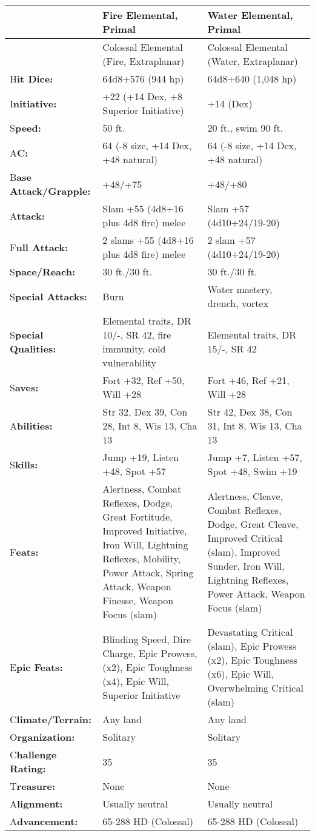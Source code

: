 \documentclass{article}
\begin{document}
\vspace{12pt}
\begin{tabular}{|>{\raggedright}p{65pt}|>{\raggedright}p{124pt}|>{\raggedright}p{124pt}|}
\hline
   & F\textbf{ire Elemental, Primal } & W\textbf{ater Elemental, Primal }\tabularnewline
\hline
 & Colossal Elemental (Fire, Extraplanar)  & Colossal Elemental (Water, Extraplanar) 
\tabularnewline
\hline
H\textbf{it Dice:}  & 64d8+576 (944 hp)  & 64d8+640 (1,048 hp) \tabularnewline
\hline
I\textbf{nitiative:}  & +22 (+14 Dex, +8 Superior Initiative)  & +14 (Dex) \tabularnewline
\hline
S\textbf{peed:}  & 50 ft.  & 20 ft., swim 90 ft. \tabularnewline
\hline
A\textbf{C:}  & 64 (-8 size, +14 Dex, +48 natural)  & 64 (-8 size, +14 Dex, +48 
natural) \tabularnewline
\hline
B\textbf{ase Attack/Grapple:} & +48/+75 & +48/+80\tabularnewline
\hline
A\textbf{ttack:} & Slam +55 (4d8+16 plus 4d8 fire) melee & Slam +57 (4d10+24/19-20)\tabularnewline
\hline
F\textbf{ull Attack:} & 2 slams +55 (4d8+16 plus 4d8 fire) melee & 2 slam +57 (4d10+24/19-20)\tabularnewline
\hline
S\textbf{pace/Reach:}  & 30 ft./30 ft.  & 30 ft./30 ft. \tabularnewline
\hline
S\textbf{pecial Attacks:}  & Burn  & Water mastery, drench, vortex \tabularnewline
\hline
S\textbf{pecial Qualities:}  & Elemental traits, DR 10/-, SR 42, fire immunity, 
cold vulnerability & Elemental traits, DR 15/-, SR 42 \tabularnewline
\hline
S\textbf{aves:} & Fort +32, Ref +50, Will +28  & Fort +46, Ref +21, Will +28 \tabularnewline
\hline
A\textbf{bilities:}  & Str 32, Dex 39, Con 28, Int 8, Wis 13, Cha 13  & Str 42, 
Dex 38, Con 31, Int 8, Wis 13, Cha 13 \tabularnewline
\hline
S\textbf{kills:}  & Jump +19, Listen +48, Spot +57 & Jump +7, Listen +57, Spot 
+48, Swim +19\tabularnewline
\hline
F\textbf{eats:} & Alertness, Combat Reflexes, Dodge, Great Fortitude, Improved 
Initiative, Iron Will, Lightning Reflexes, Mobility, Power Attack, Spring Attack, 
Weapon Finesse, Weapon Focus (slam) & Alertness, Cleave, Combat Reflexes, Dodge, 
Great Cleave, Improved Critical (slam), Improved Sunder, Iron Will, Lightning Reflexes, 
Power Attack, Weapon Focus (slam)\tabularnewline
\hline
E\textbf{pic Feats:}  & Blinding Speed, Dire Charge, Epic Prowess, (x2), Epic Toughness 
(x4), Epic Will, Superior Initiative  & Devastating Critical (slam), Epic Prowess 
(x2), Epic Toughness (x6), Epic Will, Overwhelming Critical (slam) \tabularnewline
\hline
C\textbf{limate/Terrain:}  & Any land  & Any land \tabularnewline
\hline
O\textbf{rganization:}  & Solitary  & Solitary \tabularnewline
\hline
C\textbf{hallenge Rating:}  & 35  & 35 \tabularnewline
\hline
T\textbf{reasure:}  & None  & None \tabularnewline
\hline
A\textbf{lignment:}  & Usually neutral  & Usually neutral \tabularnewline
\hline
A\textbf{dvancement:}  & 65-288 HD (Colossal)  & 65-288 HD (Colossal) \tabularnewline
\hline
\end{tabular} 
\end{document}
